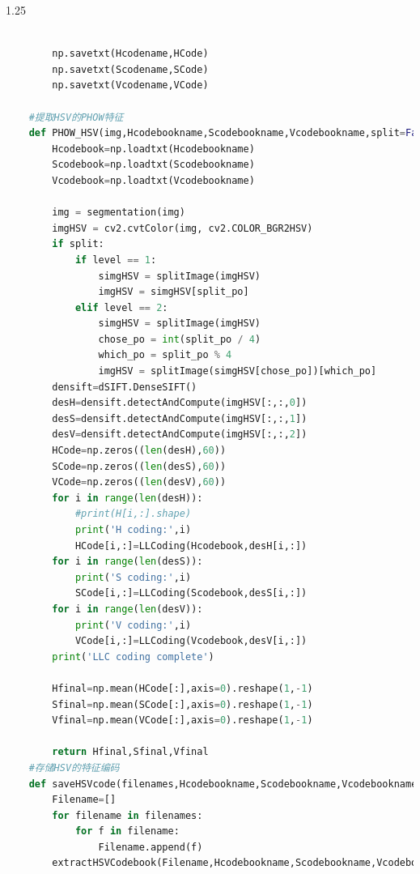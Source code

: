 \documentclass[supercite]{HustGraduPaper}
\begin{document}
\begin{sloppypar}
\begin{appendices}
\begin{spacing}{1.25}
\begin{lstlisting}[language=python]
    
        np.savetxt(Hcodename,HCode)
        np.savetxt(Scodename,SCode)
        np.savetxt(Vcodename,VCode)
    
    #提取HSV的PHOW特征
    def PHOW_HSV(img,Hcodebookname,Scodebookname,Vcodebookname,split=False,split_po=0,level=0):
        Hcodebook=np.loadtxt(Hcodebookname)
        Scodebook=np.loadtxt(Scodebookname)
        Vcodebook=np.loadtxt(Vcodebookname)
    
        img = segmentation(img)
        imgHSV = cv2.cvtColor(img, cv2.COLOR_BGR2HSV)
        if split:
            if level == 1:
                simgHSV = splitImage(imgHSV)
                imgHSV = simgHSV[split_po]
            elif level == 2:
                simgHSV = splitImage(imgHSV)
                chose_po = int(split_po / 4)
                which_po = split_po % 4
                imgHSV = splitImage(simgHSV[chose_po])[which_po]
        densift=dSIFT.DenseSIFT()
        desH=densift.detectAndCompute(imgHSV[:,:,0])
        desS=densift.detectAndCompute(imgHSV[:,:,1])
        desV=densift.detectAndCompute(imgHSV[:,:,2])
        HCode=np.zeros((len(desH),60))
        SCode=np.zeros((len(desS),60))
        VCode=np.zeros((len(desV),60))
        for i in range(len(desH)):
            #print(H[i,:].shape)
            print('H coding:',i)
            HCode[i,:]=LLCoding(Hcodebook,desH[i,:])
        for i in range(len(desS)):
            print('S coding:',i)
            SCode[i,:]=LLCoding(Scodebook,desS[i,:])
        for i in range(len(desV)):
            print('V coding:',i)
            VCode[i,:]=LLCoding(Vcodebook,desV[i,:])
        print('LLC coding complete')
    
        Hfinal=np.mean(HCode[:],axis=0).reshape(1,-1)
        Sfinal=np.mean(SCode[:],axis=0).reshape(1,-1)
        Vfinal=np.mean(VCode[:],axis=0).reshape(1,-1)
    
        return Hfinal,Sfinal,Vfinal
    #存储HSV的特征编码
    def saveHSVcode(filenames,Hcodebookname,Scodebookname,Vcodebookname,Hcodename,Scodename,Vcodename,split=False,split_po=0,level=0):
        Filename=[]
        for filename in filenames:
            for f in filename:
                Filename.append(f)
        extractHSVCodebook(Filename,Hcodebookname,Scodebookname,Vcodebookname,Hcodename,Scodename,Vcodename,split,split_po,level)
    

\end{lstlisting}
\end{spacing}
\end{appendices}
\end{sloppypar}
\end{document}

